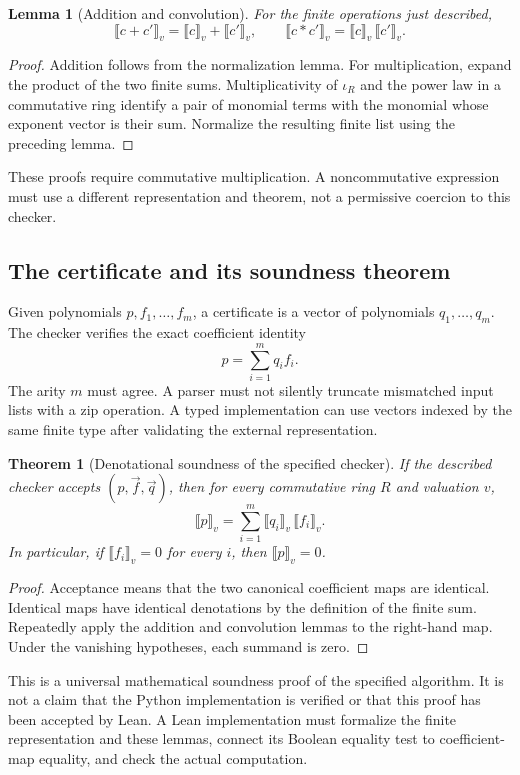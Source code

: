 \documentclass[11pt,a4paper]{article}
\newcommand{\eval}[1]{\llbracket #1\rrbracket}
\theoremstyle{plain}
\newtheorem{theorem}[proposition]{Theorem}
\newtheorem{lemma}[proposition]{Lemma}
\theoremstyle{definition}
\theoremstyle{remark}
\begin{document}
\begin{lemma}[Addition and convolution]
For the finite operations just described,
\[
 \eval{c+c'}_v=\eval c_v+\eval{c'}_v,
 \qquad
 \eval{c*c'}_v=\eval c_v\,\eval{c'}_v.
\]
\end{lemma}
\begin{proof}
Addition follows from the normalization lemma. For multiplication, expand the
product of the two finite sums. Multiplicativity of $\iota_R$ and the power
law in a commutative ring identify a pair of monomial terms with the monomial
whose exponent vector is their sum. Normalize the resulting finite list using
the preceding lemma.
\end{proof}
These proofs require commutative multiplication. A noncommutative expression
must use a different representation and theorem, not a permissive coercion to
this checker.

\subsection{The certificate and its soundness theorem}
Given polynomials $p,f_1,\ldots,f_m$, a certificate is a vector of polynomials
$q_1,\ldots,q_m$. The checker verifies the exact coefficient identity
\[
 p=\sum_{i=1}^{m}q_i f_i.
\]
The arity $m$ must agree. A parser must not silently truncate mismatched input
lists with a zip operation. A typed implementation can use vectors indexed
by the same finite type after validating the external representation.

\begin{theorem}[Denotational soundness of the specified checker]
If the described checker accepts $(p,\vec f,\vec q)$, then for every
commutative ring $R$ and valuation $v$,
\[
 \eval p_v=\sum_{i=1}^{m}\eval{q_i}_v\,\eval{f_i}_v.
\]
In particular, if $\eval{f_i}_v=0$ for every $i$, then $\eval p_v=0$.
\end{theorem}
\begin{proof}
Acceptance means that the two canonical coefficient maps are identical.
Identical maps have identical denotations by the definition of the finite
sum. Repeatedly apply the addition and convolution lemmas to the right-hand
map. Under the vanishing hypotheses, each summand is zero.
\end{proof}
This is a universal mathematical soundness proof of the specified algorithm.
It is not a claim that the Python implementation is verified or that this
proof has been accepted by Lean. A Lean implementation must formalize the
finite representation and these lemmas, connect its Boolean equality test to
coefficient-map equality, and check the actual computation.
\end{document}
